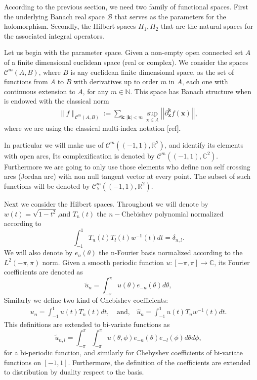 \documentclass{article}
\newcommand{\todo}[1]{{\color{red}[#1]}}
\newcommand{\IC}{{\mathbb C}}
\newcommand{\IN}{{\mathbb N}}
\newcommand{\IR}{{\mathbb R}}
\newcommand{\cmspace}[3]{\mathcal{C}^{#1} \left( #2, #3 \right)}
\newcommand{\rgeo}[1]{\mathcal{C}_b^{#1}\left( (-1,1), \IR^2 \right)}
\newcommand{\bk}{\bm{k}}
\newcommand{\bx}{\bm{x}}
\begin{document}
According to the previous section, we need two family of functional spaces. First the underlying Banach real space $\mathcal{B}$ that serves as the parameters for the holomorphism. Secondly, the Hilbert spaces $H_1,H_2$ that are the natural spaces for the associated integral operators. 

Let us begin with the parameter space. Given a non-empty open connected set $A$ of a finite dimensional euclidean space (real or complex). We consider the spaces $\cmspace{m}{A}{B}$, where $B$ is any euclidean finite dimensional space, as the set of functions from $A$ to $B$ with derivatives up to order $m$ in $A$, each one with continuous extension to $\overline{A}$, for any $m \in \IN$. This space has Banach structure when is endowed with the classical norm 
\begin{align*}
\| f \|_{\cmspace{m}{A}{B}} := \sum_{\bk: |\bk| < m } \sup_{\bx \in A}  \left\vert\left\vert\partial_{\bx}^{\bk} f(\bx) \right\vert\right\vert,
\end{align*}
where we are using the classical multi-index notation \todo{ref}. 

In particular we will make use of $\cmspace{m}{(-1,1)}{\IR^2}$, and identify its elements with open arcs, Its complexification is denoted by $\cmspace{m}{(-1,1)}{\IC^2}$. Furthermore we are going to only use those elements who define non self crossing arcs (Jordan arc) with non null tangent vector at every point. The subset of such functions will be denoted by $\rgeo{m}$. 

Next we consider the Hilbert spaces. Throughout we will denote by $w(t) = \sqrt{1-t^2}$,and $T_n(t)$ the $n-$Chebishev polynomial normalized according to $$\int_{-1}^1 T_n(t) T_l(t) w^{-1}(t) dt = \delta_{n,l}.$$ We will also denote by $e_n(\theta)$ the n-Fourier basis normalized according to the $L^2(-\pi,\pi)$ norm. 
Given a smooth periodic function $u :[-\pi,\pi] \rightarrow \IC$, its Fourier coefficients are denoted as
$$
\widetilde{u}_n = \int_{-\pi}^\pi u(\theta) e_{-n}(\theta) d\theta, 
$$
Similarly we define two kind of Chebishev coefficients:
\begin{align*}
u_n = \int_{-1}^{1} u(t) T_n(t) dt, \quad \text{and,} \quad  \widehat{u}_n = \int_{-1}^1 u(t) T_n w^{-1}(t)dt.
\end{align*}
This definitions are extended to bi-variate functions as 
$$\widetilde{u}_{n,l} = \int_{-\pi}^{\pi}\int_{-\pi}^\pi u(\theta,\phi) e_{-n}(\theta)e_{-l}(\phi) d\theta d\phi,$$
for a bi-periodic function, and similarly  for Chebyshev coefficients of  bi-variate functions on $[-1,1]$. Furthermore, the definition of the coefficients are extended to distribution by duality respect to the basis. 
\end{document}
